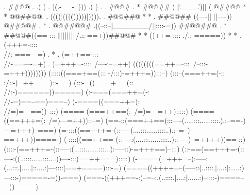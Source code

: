                          .        ##@@    .     .( )  . ((.-~~~-. )))   .( )  .     .  #@@#        .
                              *    #@@##          )      |`.___.')||      (          @##@@    *
                            *       @@##@@.     .    ((((|(((()))))|)))).     .    #@@##@       *
                         *       .    ##@@##       ((----||       ||----))       @##@@#    .       *
                               .        @@##@@# .((--::--|_______/||::::-=))  ##@@##@        .
                                    *     ##@@#((==-:::-\|||||||||||/.::-==+))##@@#     *
                                  *          ((++=-::::\-           ./.:-=====))          *
                                *       .   (+++=-::::\\             //:-===---=)   .       *
                                      .    (=++==-:::\\               //-==----=+)    .
                                          (=+++=-::::\                 /----:--=++)
                                  ((((((((==++=--:::\                   /--:::-=+++))))))))
                                 (:::::((===+==(:::\-                   -/:::)-=+++=)):::--)
                                 (:::--(===++=(-::\:                     :/::-)=++===)::-==)
                                (:::-=((===+==(::\\                       //:-)======))=====)
                                (:-===(===++=(-:\\                         //-=)==--==)===--)
                               (-====((===++=(:\\                           //=)=---==))--:::)
                               (====-(===++==(:\                             /=)=---=++):::::)
                              (====-((==+++=(:\                               /=)---=++))::--=)
                              (==-::(===++==(:::----(.....:::......::::.).:--==-)---=+++)--===)
                             (=-:::((==+++=-(::-----(....:::......::::..).:--=--)--==+++))====-)
                             (-::::((==++==-(::----:(....:::......::::..)::-----)--=++++))==-::)
                             (::::-(==+++=-(::-----:(...:::.......:::...):-----::)-=+++==)--:::)
                             (::-==(==+++=-(::----:((..::::......:::....))----:::)==++===):::::)
                             (-====(=+++=--(:-----:(...:::.|.....|::....:)---::::)==+====):::-=)
                             (====((++++=--(-----::(..::::.|....:|:.....:)---:::-)=====-=))-===)
                             (===-((+++==-:(--=--:.(..::::.|....:|......:)--::::-)====--=))====)
